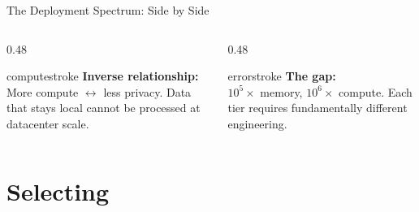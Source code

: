 \documentclass[aspectratio=169, 12pt]{beamer}
\begin{document}
\begin{frame}{The Deployment Spectrum: Side by Side}
\vspace{0.2cm}
\small
\begin{columns}[T]
  \begin{column}{0.48\textwidth}
    \begin{mlsyscard}{computestroke}
    \textbf{Inverse relationship:}\\
    {\footnotesize More compute $\leftrightarrow$ less privacy. Data that stays local cannot be processed at datacenter scale.}
    \end{mlsyscard}
  \end{column}
  \begin{column}{0.48\textwidth}
    \begin{mlsyscard}{errorstroke}
    \textbf{The gap:}\\
    {\footnotesize $10^{5}\!\times$ memory, $10^{6}\!\times$ compute. Each tier requires fundamentally different engineering.}
    \end{mlsyscard}
  \end{column}
\end{columns}

\end{frame}

\section{Selecting}
\end{document}
